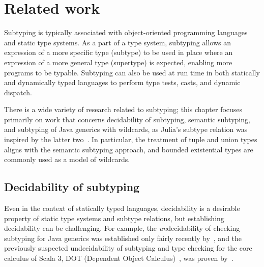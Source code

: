 \chapter{Related work}\label{chap:related-work}

Subtyping is typically associated with object-oriented programming languages and
static type systems. As a part of a type system, subtyping allows
an expression of a more specific type (subtype) to be used in place
where an expression of a more general type (supertype) is expected,
enabling more programs to be typable.
Subtyping can also be used at run time
in both statically and dynamically typed languages to perform
type tests, casts, and dynamic dispatch.

There is a wide variety of research related to subtyping; this chapter
focuses primarily on work that concerns decidability of subtyping,
semantic subtyping, and subtyping of Java generics with wildcards,
as Julia's subtype relation was inspired by the latter
two~\cite{bib:bezanson:julia:2015}.
In particular, the treatment of tuple and union types aligns with the semantic
subtyping approach, and bounded existential types are commonly used
as a model of wildcards.


\section{Decidability of subtyping}

Even in the context of statically typed languages,
decidability is a desirable property of static type systems and
subtype relations, but establishing decidability can be challenging.
For example, the \emph{un}decidability of checking subtyping for Java generics
was established only fairly recently by~\citet{bib:grigore:java-undec:2017},
and the previously suspected undecidability of subtyping and type checking for
the core calculus of Scala 3,
DOT (Dependent Object Calculus)~\cite{bib:amin:dot:2016},
was proven by~\citet{bib:hu:dot-undec:2020}.

